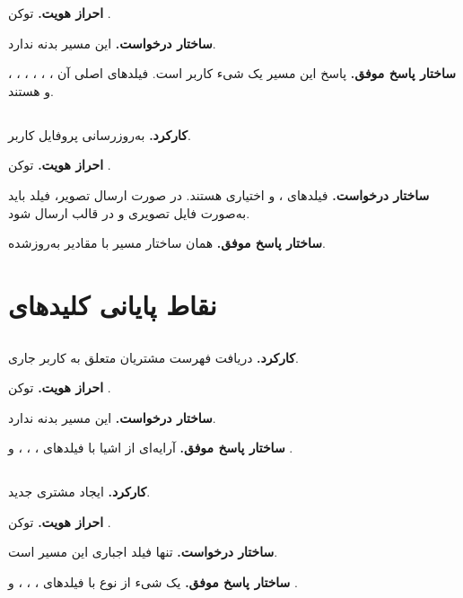 \textbf{احراز هویت.} توکن .

\textbf{ساختار درخواست.} این مسیر بدنه ندارد.

\textbf{ساختار پاسخ موفق.} پاسخ این مسیر یک شیء کاربر است.
فیلدهای اصلی آن ، ، ، ،
، ،  و
 هستند.

\subsection{}
\textbf{کارکرد.} به‌روزرسانی پروفایل کاربر.

\textbf{احراز هویت.} توکن .

\textbf{ساختار درخواست.} فیلدهای ،  و 
اختیاری هستند. در صورت ارسال تصویر، فیلد  باید به‌صورت
فایل تصویری و در قالب  ارسال شود.

\textbf{ساختار پاسخ موفق.} همان ساختار مسیر  با
مقادیر به‌روزشده.

\section{نقاط پایانی کلیدهای }

\subsection{}
\textbf{کارکرد.} دریافت فهرست مشتریان  متعلق به کاربر جاری.

\textbf{احراز هویت.} توکن .

\textbf{ساختار درخواست.} این مسیر بدنه ندارد.

\textbf{ساختار پاسخ موفق.} آرایه‌ای از اشیا با فیلدهای ،
، ،  و .

\subsection{}
\textbf{کارکرد.} ایجاد مشتری  جدید.

\textbf{احراز هویت.} توکن .

\textbf{ساختار درخواست.} تنها فیلد اجباری این مسیر  است.

\textbf{ساختار پاسخ موفق.} یک شیء از نوع  با فیلدهای
، ، ،  و
.

